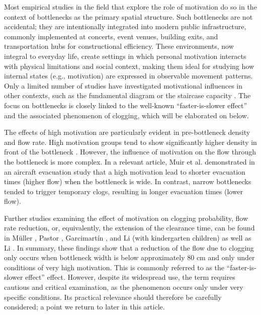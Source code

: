 \documentclass[pdflatex,sn-mathphys-num]{sn-jnl}%
\theoremstyle{thmstyleone}%
\theoremstyle{thmstyletwo}%
\theoremstyle{thmstylethree}%
\begin{document}
Most empirical studies in the field that explore the role of motivation do so in the context of bottlenecks as the primary spatial structure. Such bottlenecks are not accidental; they are intentionally integrated into modern public infrastructure, commonly implemented at concerts, event venues, building exits, and transportation hubs for constructional efficiency. These environments, now integral to everyday life, create settings in which personal motivation interacts with physical limitations and social context, making them ideal for studying how internal states (e.g., motivation) are expressed in observable movement patterns. Only a limited number of studies have investigated motivational influences in other contexts, such as the fundamental diagram \cite{ye_pedestrian_2021, ziemer_mikroskopische_2020} or the staircase capacity \cite{graat_complex_1999}. The focus on bottlenecks is closely linked to the well-known “faster-is-slower effect” and the associated phenomenon of clogging, which will be elaborated on below.

The effects of high motivation are particularly evident in pre-bottleneck density and flow rate. High motivation groups tend to show significantly higher density in front of the bottleneck \cite{sieben_collective_2017, adrian_crowds_2020, li_bottleneck_2021}. However, the influence of motivation on the flow through the bottleneck is more complex. In a relevant article, Muir et al. \cite{muir_effects_1996} demonstrated in an aircraft evacuation study that a high motivation lead to shorter evacuation times (higher flow) when the bottleneck is wide. In contrast, narrow bottlenecks tended to trigger temporary clogs, resulting in longer evacuation times (lower flow). 

Further studies examining the effect of motivation on clogging probability, flow rate reduction, or, equivalently, the extension of the clearance time, can be found in Müller \cite{muller_fluchtwegen_1981}, Pastor \cite{pastor_experimental_2015}, Garcimartín \cite{garcimartin_flow_2016}, and Li (with kindergarten children) \cite{li_bottleneck_2020} as well as Li \cite{li_motivation_2024}. In summary, these findings show that a reduction of the flow due to clogging only occurs when bottleneck width is below approximately 80 cm and only under conditions of very high motivation. This is commonly referred to as the “faster-is-slower effect” effect. However, despite its widespread use, the term requires cautious and critical examination, as the phenomenon occurs only under very specific conditions. Its practical relevance should therefore be carefully considered; a point we return to later in this article.
\end{document}
